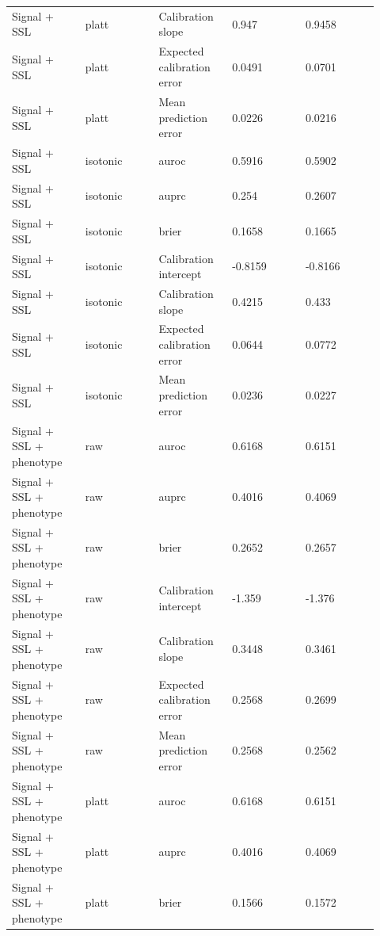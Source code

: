 \documentclass[11pt]{article}
\begin{document}
\begin{landscape}
\begin{longtable}{L{0.184\linewidth} L{0.184\linewidth} L{0.184\linewidth} L{0.184\linewidth} L{0.184\linewidth}}
Signal + SSL & platt & Calibration slope & 0.\allowbreak{}947 & 0.\allowbreak{}9458 \\
Signal + SSL & platt & Expected calibration error & 0.\allowbreak{}0491 & 0.\allowbreak{}0701 \\
Signal + SSL & platt & Mean prediction error & 0.\allowbreak{}0226 & 0.\allowbreak{}0216 \\
Signal + SSL & isotonic & auroc & 0.\allowbreak{}5916 & 0.\allowbreak{}5902 \\
Signal + SSL & isotonic & auprc & 0.\allowbreak{}254 & 0.\allowbreak{}2607 \\
Signal + SSL & isotonic & brier & 0.\allowbreak{}1658 & 0.\allowbreak{}1665 \\
Signal + SSL & isotonic & Calibration intercept & -\allowbreak{}0.\allowbreak{}8159 & -\allowbreak{}0.\allowbreak{}8166 \\
Signal + SSL & isotonic & Calibration slope & 0.\allowbreak{}4215 & 0.\allowbreak{}433 \\
Signal + SSL & isotonic & Expected calibration error & 0.\allowbreak{}0644 & 0.\allowbreak{}0772 \\
Signal + SSL & isotonic & Mean prediction error & 0.\allowbreak{}0236 & 0.\allowbreak{}0227 \\
Signal + SSL + phenotype & raw & auroc & 0.\allowbreak{}6168 & 0.\allowbreak{}6151 \\
Signal + SSL + phenotype & raw & auprc & 0.\allowbreak{}4016 & 0.\allowbreak{}4069 \\
Signal + SSL + phenotype & raw & brier & 0.\allowbreak{}2652 & 0.\allowbreak{}2657 \\
Signal + SSL + phenotype & raw & Calibration intercept & -\allowbreak{}1.\allowbreak{}359 & -\allowbreak{}1.\allowbreak{}376 \\
Signal + SSL + phenotype & raw & Calibration slope & 0.\allowbreak{}3448 & 0.\allowbreak{}3461 \\
Signal + SSL + phenotype & raw & Expected calibration error & 0.\allowbreak{}2568 & 0.\allowbreak{}2699 \\
Signal + SSL + phenotype & raw & Mean prediction error & 0.\allowbreak{}2568 & 0.\allowbreak{}2562 \\
Signal + SSL + phenotype & platt & auroc & 0.\allowbreak{}6168 & 0.\allowbreak{}6151 \\
Signal + SSL + phenotype & platt & auprc & 0.\allowbreak{}4016 & 0.\allowbreak{}4069 \\
Signal + SSL + phenotype & platt & brier & 0.\allowbreak{}1566 & 0.\allowbreak{}1572 \\

\end{longtable}
\end{landscape}
\end{document}
